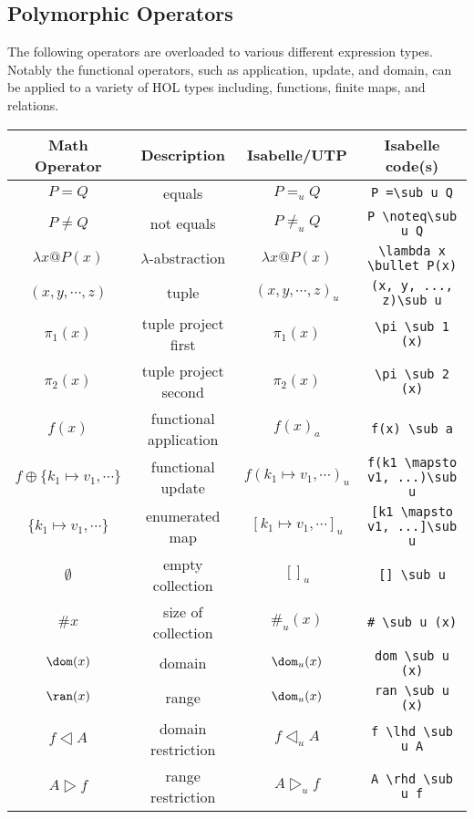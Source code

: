 \documentclass[11pt]{article}
\begin{document}
\newpage

\subsection{Polymorphic Operators}

The following operators are overloaded to various different expression types. Notably the functional operators, such as
application, update, and domain, can be applied to a variety of HOL types including, functions, finite maps, and
relations.

\begin{center}
\begin{tabular}{|c|c|c|c|} \hline
  \textbf{Math Operator}    & \textbf{Description}        & \textbf{Isabelle/UTP}   & \textbf{Isabelle code(s)} \\ \hline
  $P = Q$                   & equals                      & $P =_u Q$               & \verb|P =\sub u Q| \\ 
  $P \neq Q$                & not equals                  & $P \neq_u Q$            & \verb|P \noteq\sub u Q| \\ 
  $\lambda x @ P(x)$        & $\lambda$-abstraction       & $\lambda x @ P(x)$      & \verb|\lambda x \bullet P(x)| \\
  $(x,y,\cdots,z)$          & tuple                       & $(x, y, \cdots, z)_u$   & \verb|(x, y, ..., z)\sub u| \\
  $\pi_1(x)$                & tuple project first         & $\pi_1(x)$              & \verb|\pi \sub 1 (x)| \\
  $\pi_2(x)$                & tuple project second        & $\pi_2(x)$              & \verb|\pi \sub 2 (x)| \\
  $f(x)$                    & functional application      & $f(x)_a$                & \verb|f(x) \sub a| \\
  $f \oplus \{k_1 \mapsto v_1, \cdots\}$ 
                            & functional update           & $f(k_1 \mapsto v_1, \cdots)_u$ & \verb|f(k1 \mapsto v1, ...)\sub u| \\
  $\{k_1 \mapsto v_1, \cdots\}$ & enumerated map           & $[k_1 \mapsto v_1, \cdots]_u$ & \verb|[k1 \mapsto v1, ...]\sub u| \\
  $\emptyset$               & empty collection            & $[]_u$                  & \verb|[] \sub u| \\
  $\#x$                     & size of collection          & $\#_u(x)$               & \verb|# \sub u (x)| \\ 
  $\dom(x)$                 & domain                      & $\dom_u(x)$             & \verb|dom \sub u (x)| \\
  $\ran(x)$                 & range                       & $\dom_u(x)$             & \verb|ran \sub u (x)| \\
  $f \dres A$               & domain restriction          & $f \dres_u A$           & \verb|f \lhd \sub u A| \\
  $A \rres f$               & range restriction           & $A \rres_u f$           & \verb|A \rhd \sub u f| \\
  \hline
\end{tabular}
\end{center}
\end{document}
